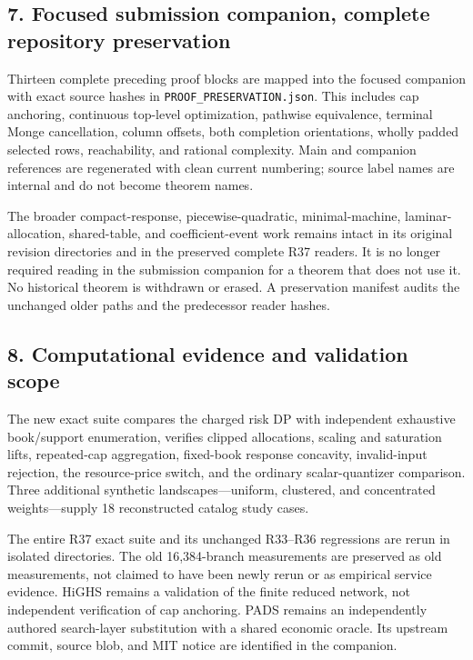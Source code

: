 \documentclass[11pt,letterpaper]{article}
\begin{document}
\subsection*{7. Focused submission companion, complete repository preservation}


Thirteen complete preceding proof blocks are mapped into the focused companion with exact source hashes in \nolinkurl{PROOF_PRESERVATION.json}. This includes cap anchoring, continuous top-level optimization, pathwise equivalence, terminal Monge cancellation, column offsets, both completion orientations, wholly padded selected rows, reachability, and rational complexity. Main and companion references are regenerated with clean current numbering; source label names are internal and do not become theorem names.



The broader compact-response, piecewise-quadratic, minimal-machine, laminar-allocation, shared-table, and coefficient-event work remains intact in its original revision directories and in the preserved complete R37 readers. It is no longer required reading in the submission companion for a theorem that does not use it. No historical theorem is withdrawn or erased. A preservation manifest audits the unchanged older paths and the predecessor reader hashes.



\subsection*{8. Computational evidence and validation scope}


The new exact suite compares the charged risk DP with independent exhaustive book/support enumeration, verifies clipped allocations, scaling and saturation lifts, repeated-cap aggregation, fixed-book response concavity, invalid-input rejection, the resource-price switch, and the ordinary scalar-quantizer comparison. Three additional synthetic landscapes—uniform, clustered, and concentrated weights—supply 18 reconstructed catalog study cases.



The entire R37 exact suite and its unchanged R33–R36 regressions are rerun in isolated directories. The old 16,384-branch measurements are preserved as old measurements, not claimed to have been newly rerun or as empirical service evidence. HiGHS remains a validation of the finite reduced network, not independent verification of cap anchoring. PADS remains an independently authored search-layer substitution with a shared economic oracle. Its upstream commit, source blob, and MIT notice are identified in the companion.
\end{document}
